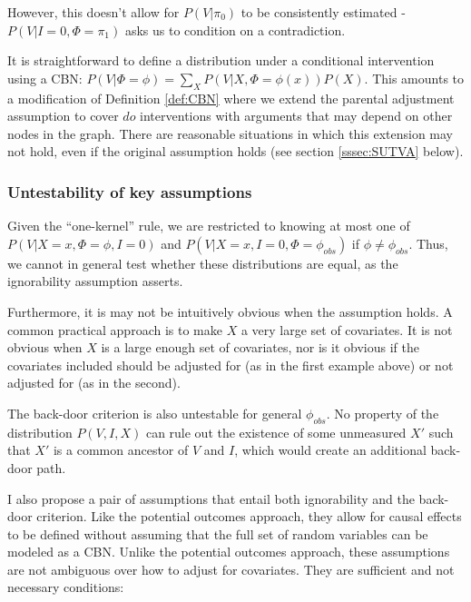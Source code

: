 \begin{center}
\end{center}

However, this doesn't allow for $P(V|\pi_0)$ to be consistently estimated - $P(V|I=0,\Phi=\pi_1)$ asks us to condition on a contradiction.

It is straightforward to define a distribution under a conditional intervention using a CBN: $P(V|\Phi=\phi)=\sum_X P(V|X,\Phi=\phi(x)) P(X)$. This amounts to a modification of Definition \ref{def:CBN} where we extend the parental adjustment assumption to cover $do$ interventions with arguments that may depend on other nodes in the graph. There are reasonable situations in which this extension may not hold, even if the original assumption holds (see section \ref{sssec:SUTVA} below).

\subsubsection{Untestability of key assumptions}

Given the ``one-kernel'' rule, we are restricted to knowing at most one of $P(V|X=x,\Phi=\phi,I=0)$ and $P(V|X=x, I=0, \Phi=\phi_{obs})$ if $\phi\neq \phi_{obs}$. Thus, we cannot in general test whether these distributions are equal, as the ignorability assumption asserts. 

Furthermore, it is may not be intuitively obvious when the assumption holds. A common practical approach is to make $X$ a very large set of covariates. It is not obvious when $X$ is a large enough set of covariates, nor is it obvious if the covariates included should be adjusted for (as in the first example above) or not adjusted for (as in the second).

The back-door criterion is also untestable for general $\phi_{obs}$. No property of the distribution $P(V,I,X)$ can rule out the existence of some unmeasured $X'$ such that $X'$ is a common ancestor of $V$ and $I$, which would create an additional back-door path.

I also propose a pair of assumptions that entail both ignorability and the back-door criterion. Like the potential outcomes approach, they allow for causal effects to be defined without assuming that the full set of random variables can be modeled as a CBN. Unlike the potential outcomes approach, these assumptions are not ambiguous over how to adjust for covariates. They are sufficient and not necessary conditions:

